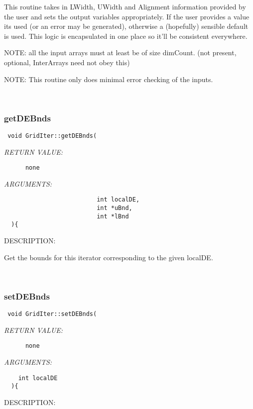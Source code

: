      This routine takes in LWidth, UWidth and Alignment information provided by the user
   and sets the output variables appropriately. If the user provides a value its used
   (or an error may be generated), otherwise a (hopefully) sensible default is used.
   This logic is encapsulated in one place so it'll be consistent everywhere. 
  
   NOTE: all the input arrays must at least be of size dimCount. (not present, optional,
         InterArrays need not obey this)
    
   NOTE: This routine only does minimal error checking of the inputs.
   
 
\mbox{}\hrulefill\
 
\subsubsection [getDEBnds] {getDEBnds}


  
\begin{verbatim} void GridIter::getDEBnds(\end{verbatim}{\em RETURN VALUE:}
\begin{verbatim}      none\end{verbatim}{\em ARGUMENTS:}
\begin{verbatim}    
                          int localDE,
                          int *uBnd,
                          int *lBnd
  ){\end{verbatim}
{\sf DESCRIPTION:\\ }


   Get the bounds for this iterator corresponding to the given localDE. 
   
 
\mbox{}\hrulefill\
 
\subsubsection [setDEBnds] {setDEBnds}


  
\begin{verbatim} void GridIter::setDEBnds(\end{verbatim}{\em RETURN VALUE:}
\begin{verbatim}      none\end{verbatim}{\em ARGUMENTS:}
\begin{verbatim}    
    int localDE
  ){\end{verbatim}
{\sf DESCRIPTION:\\ }


